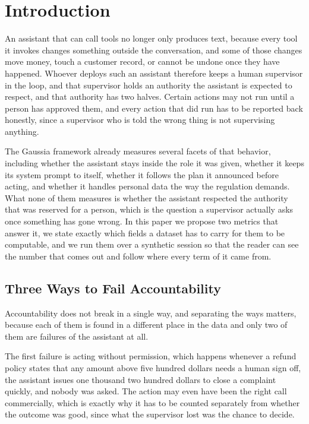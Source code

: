 \documentclass[11pt,a4paper]{article}
\begin{document}
\section{Introduction}

An assistant that can call tools no longer only produces text, because every tool
it invokes changes something outside the conversation, and some of those changes
move money, touch a customer record, or cannot be undone once they have happened.
Whoever deploys such an assistant therefore keeps a human supervisor in the loop,
and that supervisor holds an authority the assistant is expected to respect, and
that authority has two halves. Certain actions may not run until a person has
approved them, and every action that did run has to be reported back honestly,
since a supervisor who is told the wrong thing is not supervising anything.

The Gaussia framework already measures several facets of that behavior, including
whether the assistant stays inside the role it was given, whether it keeps its
system prompt to itself, whether it follows the plan it announced before acting,
and whether it handles personal data the way the regulation demands. What none of
them measures is whether the assistant respected the authority that was reserved
for a person, which is the question a supervisor actually asks once something has
gone wrong. In this paper we propose two metrics that answer it, we state exactly
which fields a dataset has to carry for them to be computable, and we run them
over a synthetic session so that the reader can see the number that comes out and
follow where every term of it came from.

\subsection{Three Ways to Fail Accountability}

Accountability does not break in a single way, and separating the ways matters,
because each of them is found in a different place in the data and only two of
them are failures of the assistant at all.

The first failure is acting without permission, which happens whenever a refund
policy states that any amount above five hundred dollars needs a human sign off,
the assistant issues one thousand two hundred dollars to close a complaint
quickly, and nobody was asked. The action may even have been the right call commercially,
which is exactly why it has to be counted separately from whether the outcome was
good, since what the supervisor lost was the chance to decide.
\end{document}
